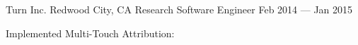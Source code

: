 \documentclass[11pt]{resume}
\begin{document}
  \begin{cventries}

      \begin{cventries}
        \cventry
        { Turn Inc. }
        { Redwood City, CA }
        { Research Software Engineer }
        { Feb 2014 — Jan 2015 }
        { \item { Implemented Multi-Touch Attribution:  } }
      \end{cventries}



\end{cventries}
\end{document}
